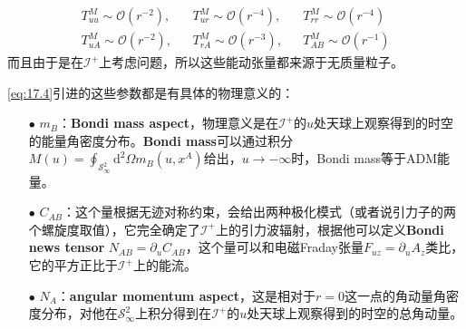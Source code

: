 \begin{align*}
	T^M_{uu}\sim\mathcal{O}(r^{-2}),& &T^M_{ur}\sim\mathcal{O}(r^{-4}),&&T^M_{rr}\sim\mathcal{O}(r^{-4})\\
	T^M_{uA}\sim\mathcal{O}(r^{-2}),&&T^M_{rA}\sim\mathcal{O}(r^{-3}),&&T^M_{AB}\sim\mathcal{O}(r^{-1})
\end{align*}
而且由于是在$\mathcal{I}^+$上考虑问题，所以这些能动张量都来源于无质量粒子。

\ref{eq:17.4}引进的这些参数都是有具体的物理意义的：
\begin{itemize}
	\item[$\bullet$]$m_B$：\textbf{Bondi mass aspect}，物理意义是在$\mathcal{I}^+$的$u$处天球上观察得到的时空的能量角密度分布。\textbf{Bondi mass}可以通过积分$M(u)=\oint_{\mathcal{S}^2_\infty}\mathrm{d}^2\Omega m_B(u,x^A)$给出，$u\to-\infty$时，Bondi mass等于ADM能量。
	\item[$\bullet$]$C_{AB}$：这个量根据无迹对称约束，会给出两种极化模式（或者说引力子的两个螺旋度取值），它完全确定了$\mathcal{I}^+$上的引力波辐射，根据他可以定义\textbf{Bondi news tensor} $N_{AB}=\partial_u C_{AB}$，这个量可以和电磁Fraday张量$F_{uz}=\partial_u A_z$类比，它的平方正比于$\mathcal{I}^+$上的能流。
	\item[$\bullet$]$N_A$：\textbf{angular momentum aspect}，这是相对于$r=0$这一点的角动量角密度分布，对他在$\mathcal{S}^2_\infty$上积分得到在$\mathcal{I}^+$的$u$处天球上观察得到的时空的总角动量。
\end{itemize}

